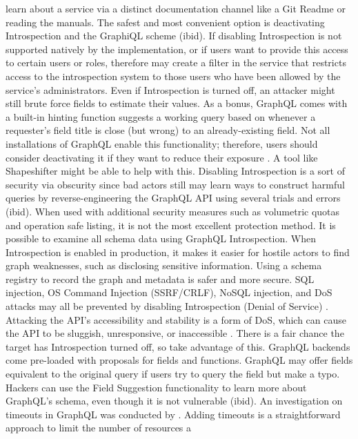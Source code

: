 learn about a service via a distinct documentation channel like a Git Readme or
reading the manuals. The safest and most convenient option is deactivating
Introspection and the GraphiQL scheme (ibid). If disabling Introspection is not
supported natively by the implementation, or if users want to provide this
access to certain users or roles, therefore may create a filter in the service
that restricts access to the introspection system to those users who have been
allowed by the service's administrators. Even if Introspection is turned off, an
attacker might still brute force fields to estimate their values. As a bonus,
GraphQL comes with a built-in hinting function suggests a working query based on
whenever a requester's field title is close (but wrong) to an already-existing
field. Not all installations of GraphQL enable this functionality; therefore,
users should consider deactivating it if they want to reduce their exposure
\citep{kouraiSecureOffloadingLegacy2016}. A tool like Shapeshifter might be able
to help with this. Disabling Introspection is a sort of security via obscurity
since bad actors still may learn ways to construct harmful queries by
reverse-engineering the GraphQL API using several trials and errors (ibid). When
used with additional security measures such as volumetric quotas and operation
safe listing, it is not the most excellent protection method. It is possible to
examine all schema data using GraphQL Introspection. When Introspection is
enabled in production, it makes it easier for hostile actors to find graph
weaknesses, such as disclosing sensitive information. Using a schema registry to
record the graph and metadata is safer and more secure. SQL injection, OS
Command Injection (SSRF/CRLF), NoSQL injection, and DoS attacks may all be
prevented by disabling Introspection (Denial of Service) \citep{
eizingerAPIDesignDistributed2017}. Attacking the API's accessibility and
stability is a form of DoS, which can cause the API to be sluggish, unresponsive,
or inaccessible \citep{gozneliIdentificationEvaluationProcess2020}. There is a
fair chance the target has Introspection turned off, so take advantage of this.
GraphQL backends come pre-loaded with proposals for fields and functions.
GraphQL may offer fields equivalent to the original query if users try to query
the field but make a typo. Hackers can use the Field Suggestion functionality to
learn more about
GraphQL's schema, even though it is not vulnerable (ibid). An investigation on
timeouts in GraphQL was conducted by \citet{ witternEmpiricalStudyGraphQL2019}.
Adding timeouts is a straightforward approach to limit the number of resources a
